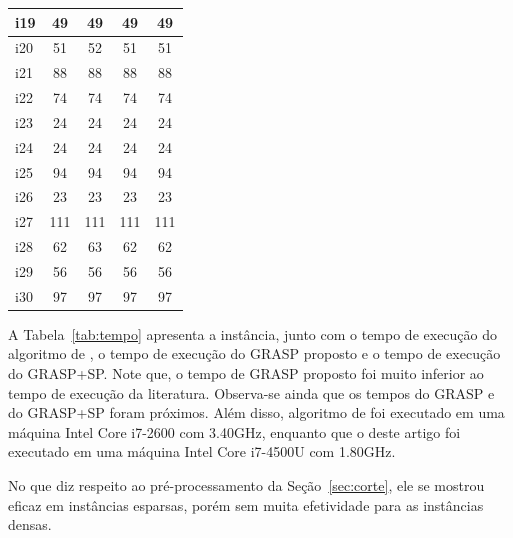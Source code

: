 \documentclass[article]{rian_article}
\begin{document}
\begin{table}[htb]
\begin{tabular}{|l|c|c|c|c|}
i19         	& 49	  & 49	  & 49		& 49		\\ \hline
i20         	& 51	  & 52	  & 51		& 51		\\ \hline
i21         	& 88	  & 88	  & 88		& 88		\\ \hline
i22         	& 74	  & 74	  & 74		& 74		\\ \hline
i23         	& 24	  & 24	  & 24		& 24		\\ \hline
i24         	& 24	  & 24	  & 24		& 24		\\ \hline
i25         	& 94	  & 94	  & 94		& 94		\\ \hline
i26         	& 23	  & 23	  & 23		& 23		\\ \hline
i27         	& 111	  & 111	  & 111		& 111		\\ \hline
i28         	& 62	  & 63	  & 62		& 62		\\ \hline
i29         	& 56	  & 56	  & 56		& 56		\\ \hline
i30         	& 97	  & 97	  & 97		& 97		\\ \hline
\end{tabular}
\end{table}
 
A Tabela~\ref{tab:tempo} apresenta a instância, junto com o tempo de execução do algoritmo de \citet{martello2002}, o tempo de execução do GRASP proposto e o tempo de execução do GRASP+SP.
Note que, o tempo de GRASP proposto foi muito inferior ao tempo de execução da literatura.
Observa-se ainda que os tempos do GRASP e do GRASP+SP foram próximos.
Além disso, algoritmo de foi executado em uma máquina Intel Core i7-2600 com 3.40GHz, enquanto que o deste artigo foi executado em uma máquina Intel Core i7-4500U com 1.80GHz.


No que diz respeito ao pré-processamento da Seção~\ref{sec:corte}, ele se mostrou eficaz em instâncias esparsas, porém sem muita efetividade para as instâncias densas.
\end{document}
